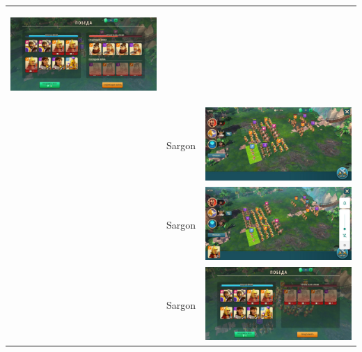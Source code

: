 \begin{longtable}{|c|c|c|}
    \hypertarget{fight35}{\includegraphics[width=0.75\linewidth]{./parts/media/TreasureHunt/35/sargon/photo_2022-04-07_10-08-41.jpg}} \\
    & Sargon &
    \includegraphics[width=0.75\linewidth]{./parts/media/TreasureHunt/35/sargon/photo_2022-04-07_10-08-45.jpg} \\
    & Sargon &
    \includegraphics[width=0.75\linewidth]{./parts/media/TreasureHunt/35/sargon/photo_2022-04-07_10-08-33.jpg} \\
    & Sargon &
    \includegraphics[width=0.75\linewidth]{./parts/media/TreasureHunt/35/sargon/photo_2022-04-07_10-08-48.jpg} \\

\end{longtable}

